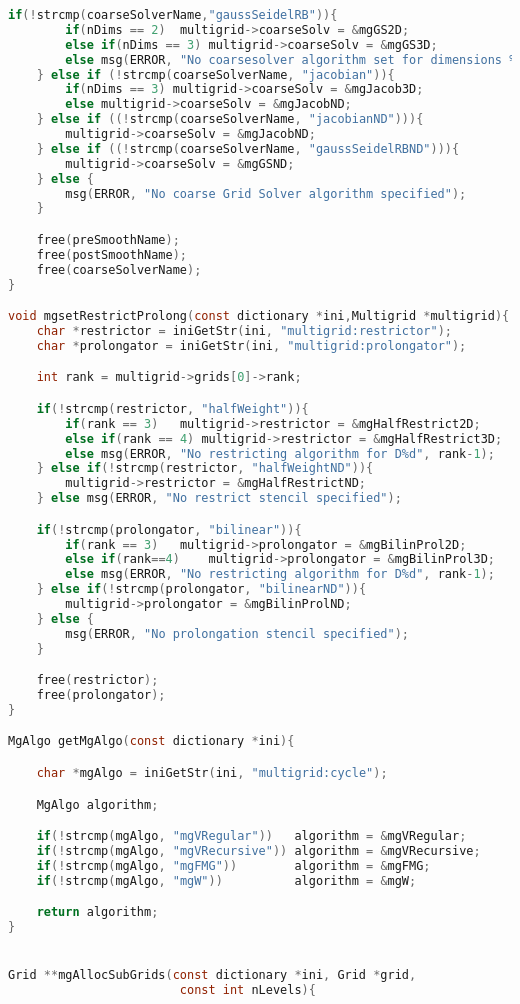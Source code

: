 \begin{lstlisting}[language=c, caption = main routine]
    if(!strcmp(coarseSolverName,"gaussSeidelRB")){
		if(nDims == 2)	multigrid->coarseSolv = &mgGS2D;
		else if(nDims == 3) multigrid->coarseSolv = &mgGS3D;
		else msg(ERROR, "No coarsesolver algorithm set for dimensions %d", nDims);
	} else if (!strcmp(coarseSolverName, "jacobian")){
		if(nDims == 3) multigrid->coarseSolv = &mgJacob3D;
		else multigrid->coarseSolv = &mgJacobND;
	} else if ((!strcmp(coarseSolverName, "jacobianND"))){
		multigrid->coarseSolv = &mgJacobND;
	} else if ((!strcmp(coarseSolverName, "gaussSeidelRBND"))){
		multigrid->coarseSolv = &mgGSND;
 	} else {
    	msg(ERROR, "No coarse Grid Solver algorithm specified");
    }

    free(preSmoothName);
    free(postSmoothName);
    free(coarseSolverName);
}

void mgsetRestrictProlong(const dictionary *ini,Multigrid *multigrid){
	char *restrictor = iniGetStr(ini, "multigrid:restrictor");
	char *prolongator = iniGetStr(ini, "multigrid:prolongator");

	int rank = multigrid->grids[0]->rank;

	if(!strcmp(restrictor, "halfWeight")){
		if(rank == 3)	multigrid->restrictor = &mgHalfRestrict2D;
		else if(rank == 4) multigrid->restrictor = &mgHalfRestrict3D;
		else msg(ERROR, "No restricting algorithm for D%d", rank-1);
	} else if(!strcmp(restrictor, "halfWeightND")){
		multigrid->restrictor = &mgHalfRestrictND;
	} else msg(ERROR, "No restrict stencil specified");

	if(!strcmp(prolongator, "bilinear")){
		if(rank == 3)	multigrid->prolongator = &mgBilinProl2D;
		else if(rank==4)	multigrid->prolongator = &mgBilinProl3D;
		else msg(ERROR, "No restricting algorithm for D%d", rank-1);
	} else if(!strcmp(prolongator, "bilinearND")){
		multigrid->prolongator = &mgBilinProlND;
	} else {
		msg(ERROR, "No prolongation stencil specified");
	}

	free(restrictor);
	free(prolongator);
}

MgAlgo getMgAlgo(const dictionary *ini){

	char *mgAlgo = iniGetStr(ini, "multigrid:cycle");

	MgAlgo algorithm;

	if(!strcmp(mgAlgo, "mgVRegular"))	algorithm = &mgVRegular;
	if(!strcmp(mgAlgo, "mgVRecursive"))	algorithm = &mgVRecursive;
	if(!strcmp(mgAlgo, "mgFMG"))		algorithm = &mgFMG;
	if(!strcmp(mgAlgo, "mgW"))			algorithm = &mgW;

	return algorithm;
}


Grid **mgAllocSubGrids(const dictionary *ini, Grid *grid,
						const int nLevels){


\end{lstlisting}
